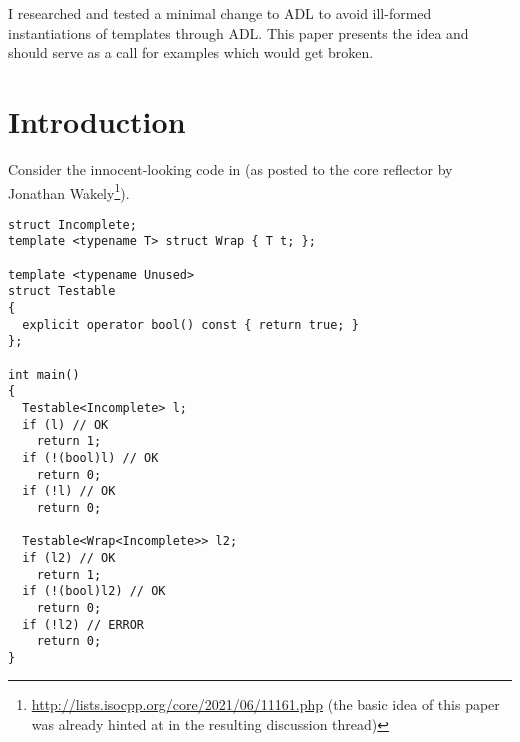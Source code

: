 \newcommand\wgTitle{A minimal ADL restriction to avoid ill-formed template instantiation}
\newcommand\wgName{Matthias Kretz <m.kretz@gsi.de>}
\newcommand\wgDocumentNumber{DMADLR0}
\newcommand\wgGroup{EWG}
\newcommand\wgTarget{\CC{}26}

\usepackage{mymacros}
\usepackage{wg21}
\usepackage{changelog}
\usepackage{underscore}



\newcommand\wglink[1]{\href{https://wg21.link/#1}{#1}}
\newcommand\notyetinstantiated{not\hyp{}yet\hyp{}instantiated\hyp{}template}


\begin{wgTitlepage}
  I researched and tested a minimal change to ADL to avoid ill-formed instantiations of 
  templates through ADL. This paper presents the idea and should serve as a call for 
  examples which would get broken.
\end{wgTitlepage}

\pagestyle{scrheadings}

%

%

\section{Introduction}

Consider the innocent-looking code in  (as posted to the core reflector by 
Jonathan Wakely\footnote{\url{http://lists.isocpp.org/core/2021/06/11161.php} (the basic 
idea of this paper was already hinted at in the resulting discussion thread)}).
\begin{lstlisting}[style=Vc,float={hb},label=lst:example1,caption={
Ill-formed instantiation of \type{Wrap<Incomplete>} because of ADL
}]
struct Incomplete;
template <typename T> struct Wrap { T t; };

template <typename Unused>
struct Testable
{
  explicit operator bool() const { return true; }
};

int main()
{
  Testable<Incomplete> l;
  if (l) // OK
    return 1;
  if (!(bool)l) // OK
    return 0;
  if (!l) // OK
    return 0;

  Testable<Wrap<Incomplete>> l2;
  if (l2) // OK
    return 1;
  if (!(bool)l2) // OK
    return 0;
  if (!l2) // ERROR
    return 0;
}
\end{lstlisting}

